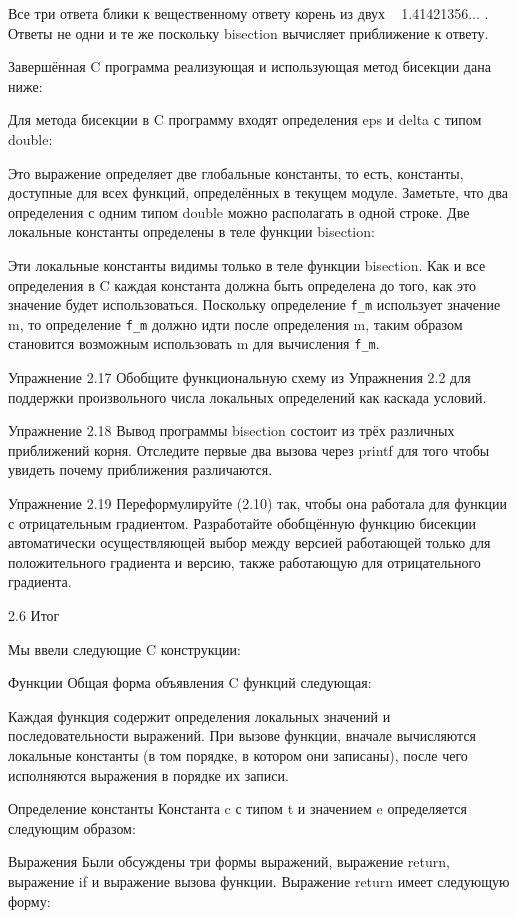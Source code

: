 Все три ответа блики к вещественному ответу корень из двух ~ 1.41421356... . Ответы не одни и те же поскольку bisection вычисляет приближение к ответу.

Завершённая C программа реализующая и использующая метод бисекции дана ниже:

Для метода бисекции в C программу входят определения eps и delta с типом double:

Это выражение определяет две глобальные константы, то есть, константы, доступные для всех функций, определённых в текущем модуле. Заметьте, что два определения с одним типом double можно располагать в одной строке. Две локальные константы определены в теле функции bisection:

Эти локальные константы видимы только в теле функции bisection. Как и все определения в C каждая константа должна быть определена до того, как это значение будет использоваться. Поскольку определение \lstinline|f_m| использует значение m, то определение \lstinline|f_m| должно идти после определения m, таким образом становится возможным использовать m для вычисления \lstinline|f_m|.

Упражнение 2.17 Обобщите функциональную схему из Упражнения 2.2 для поддержки произвольного числа локальных определений как каскада условий.

Упражнение 2.18 Вывод программы bisection состоит из трёх различных приближений корня. Отследите первые два вызова через printf для того чтобы увидеть почему приближения различаются.

Упражнение 2.19 Переформулируйте (2.10) так, чтобы она работала для функции с отрицательным градиентом. Разработайте обобщённую функцию бисекции автоматически осуществляющей выбор между версией работающей только для положительного градиента и версию, также работающую для отрицательного градиента.

2.6 Итог

Мы ввели следующие C конструкции:

Функции Общая форма объявления C функций следующая:

Каждая функция содержит определения локальных значений и последовательности выражений. При вызове функции, вначале вычисляются локальные константы (в том порядке, в котором они записаны), после чего исполняются выражения в порядке их записи.

Определение константы Константа c с типом t и значением e определяется следующим образом:

Выражения Были обсуждены три формы выражений, выражение return, выражение if и выражение вызова функции. Выражение return имеет следующую форму:

